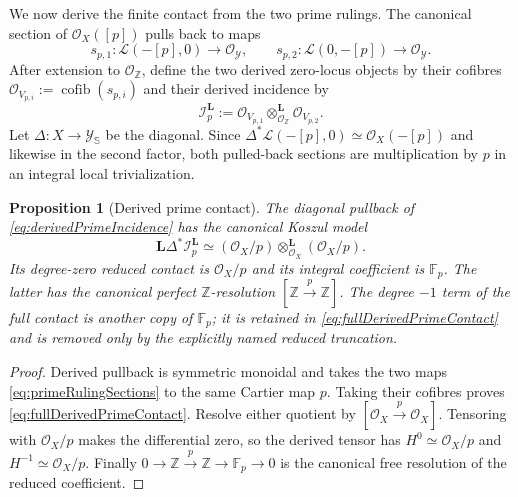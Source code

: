 \documentclass[11pt]{amsart}
\newtheorem{proposition}[theorem]{Proposition}
\theoremstyle{definition}
\theoremstyle{remark}
\newcommand{\Z}{\mathbb Z}
\begin{document}
We now derive the finite contact from the two prime rulings.  The canonical
section of $\mathcal O_X([p])$ pulls back to maps
\begin{equation}\label{eq:primeRulingSections}
 s_{p,1}:\mathcal L(-[p],0)\longrightarrow\mathcal O_{\mathscr Y},
 \qquad
 s_{p,2}:\mathcal L(0,-[p])\longrightarrow\mathcal O_{\mathscr Y}.
\end{equation}
After extension to $\mathcal O_{\Z}$, define the two derived zero-locus
objects by their cofibres
$\mathcal O_{V_{p,i}}:=\operatorname{cofib}(s_{p,i})$ and their derived
incidence by
\begin{equation}\label{eq:derivedPrimeIncidence}
 \mathcal I_p^{\mathbf L}:=
 \mathcal O_{V_{p,1}}\otimes_{\mathcal O_{\Z}}^{\mathbf L}
 \mathcal O_{V_{p,2}}.
\end{equation}
Let $\Delta:X\to\mathscr Y_{\mathbb S}$ be the diagonal.  Since
$\Delta^*\mathcal L(-[p],0)\simeq\mathcal O_X(-[p])$ and likewise in the
second factor, both pulled-back sections are multiplication by $p$ in an
integral local trivialization.

\begin{proposition}[Derived prime contact]
\label{prop:derivedPrimeContact}
The diagonal pullback of \eqref{eq:derivedPrimeIncidence} has the canonical
Koszul model
\begin{equation}\label{eq:fullDerivedPrimeContact}
 \mathbf L\Delta^*\mathcal I_p^{\mathbf L}
 \simeq
 (\mathcal O_X/p)\otimes_{\mathcal O_X}^{\mathbf L}
 (\mathcal O_X/p).
\end{equation}
Its degree-zero reduced contact is $\mathcal O_X/p$ and its integral
coefficient is $\mathbb F_p$.  The latter has the canonical perfect
$\Z$-resolution $[\Z\xrightarrow p\Z]$.  The degree $-1$ term of the full
contact is another copy of $\mathbb F_p$; it is retained in
\eqref{eq:fullDerivedPrimeContact} and is removed only by the explicitly
named reduced truncation.
\end{proposition}

\begin{proof}
Derived pullback is symmetric monoidal and takes the two maps
\eqref{eq:primeRulingSections} to the same Cartier map $p$.  Taking their
cofibres proves \eqref{eq:fullDerivedPrimeContact}.  Resolve either quotient
by $[\mathcal O_X\xrightarrow p\mathcal O_X]$.  Tensoring with
$\mathcal O_X/p$ makes the differential zero, so the derived tensor has
$H^0\simeq\mathcal O_X/p$ and
$H^{-1}\simeq\mathcal O_X/p$.  Finally
$0\to\Z\xrightarrow p\Z\to\mathbb F_p\to0$ is the canonical free
resolution of the reduced coefficient.
\end{proof}
\end{document}

